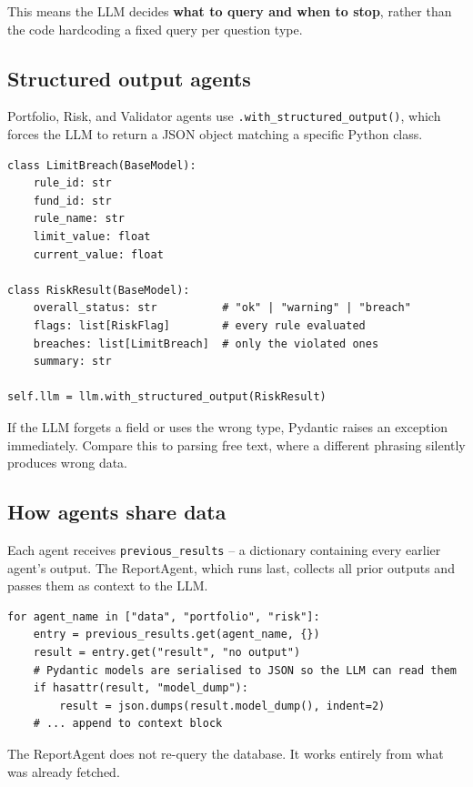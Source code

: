 \documentclass[12pt,a4paper]{article}
\begin{document}
This means the LLM decides \textbf{what to query and when to stop}, rather than the code hardcoding a fixed query per question type.

\subsection{Structured output agents}

Portfolio, Risk, and Validator agents use \texttt{.with\_structured\_output()}, which forces the LLM to return a JSON object matching a specific Python class.

\begin{lstlisting}[caption={RiskAgent output schema (simplified)}]
class LimitBreach(BaseModel):
    rule_id: str
    fund_id: str
    rule_name: str
    limit_value: float
    current_value: float

class RiskResult(BaseModel):
    overall_status: str          # "ok" | "warning" | "breach"
    flags: list[RiskFlag]        # every rule evaluated
    breaches: list[LimitBreach]  # only the violated ones
    summary: str

self.llm = llm.with_structured_output(RiskResult)
\end{lstlisting}

If the LLM forgets a field or uses the wrong type, Pydantic raises an exception immediately. Compare this to parsing free text, where a different phrasing silently produces wrong data.

\subsection{How agents share data}

Each agent receives \texttt{previous\_results} -- a dictionary containing every earlier agent's output. The ReportAgent, which runs last, collects all prior outputs and passes them as context to the LLM.

\begin{lstlisting}[caption={ReportAgent assembling context from prior agents}]
for agent_name in ["data", "portfolio", "risk"]:
    entry = previous_results.get(agent_name, {})
    result = entry.get("result", "no output")
    # Pydantic models are serialised to JSON so the LLM can read them
    if hasattr(result, "model_dump"):
        result = json.dumps(result.model_dump(), indent=2)
    # ... append to context block
\end{lstlisting}

The ReportAgent does not re-query the database. It works entirely from what was already fetched.
\end{document}
